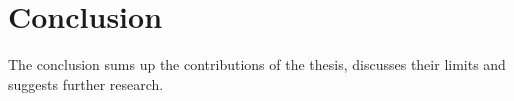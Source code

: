 \chapter{Conclusion}
\label{chap:conclusion}

The conclusion sums up the contributions of the thesis, discusses their
limits and suggests further research.
